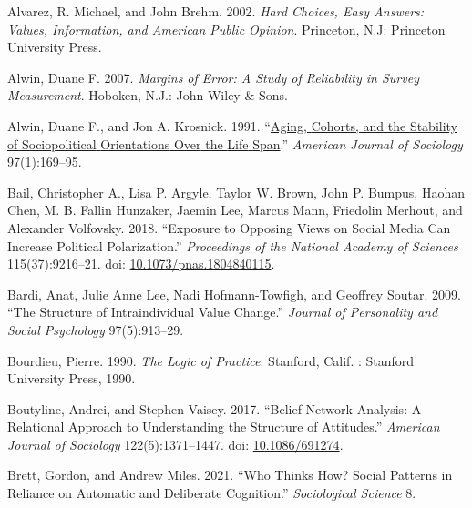 \documentclass[
  12pt,
]{article}
\newlength{\cslhangindent}
\newlength{\cslentryspacingunit} %
\newenvironment{CSLReferences}[2] %
 {%
  \setlength{\parindent}{0pt}
  \ifodd #1
  \let\oldpar\par
  \def\par{\hangindent=\cslhangindent\oldpar}
  \fi
  \setlength{\parskip}{#2\cslentryspacingunit}
 }%
 {}
\begin{document}
\hypertarget{refs}{}
\begin{CSLReferences}{1}{0}
\leavevmode{}%
Alvarez, R. Michael, and John Brehm. 2002. \emph{Hard Choices, Easy
Answers: Values, Information, and {American} Public Opinion}. Princeton,
N.J: Princeton University Press.

\leavevmode{}%
Alwin, Duane F. 2007. \emph{Margins of {Error}: {A} {Study} of
{Reliability} in {Survey} {Measurement}}. Hoboken, N.J.: John Wiley \&
Sons.

\leavevmode{}%
Alwin, Duane F., and Jon A. Krosnick. 1991.
{``\href{https://www.jstor.org/stable/2781642}{Aging, {Cohorts}, and the
{Stability} of {Sociopolitical} {Orientations} {Over} the {Life}
{Span}}.''} \emph{American Journal of Sociology} 97(1):169--95.

\leavevmode{}%
Bail, Christopher A., Lisa P. Argyle, Taylor W. Brown, John P. Bumpus,
Haohan Chen, M. B. Fallin Hunzaker, Jaemin Lee, Marcus Mann, Friedolin
Merhout, and Alexander Volfovsky. 2018. {``Exposure to Opposing Views on
Social Media Can Increase Political Polarization.''} \emph{Proceedings
of the National Academy of Sciences} 115(37):9216--21. doi:
\href{https://doi.org/10.1073/pnas.1804840115}{10.1073/pnas.1804840115}.

\leavevmode{}%
Bardi, Anat, Julie Anne Lee, Nadi Hofmann-Towfigh, and Geoffrey Soutar.
2009. {``The Structure of Intraindividual Value Change.''} \emph{Journal
of Personality and Social Psychology} 97(5):913--29.

\leavevmode{}%
Bourdieu, Pierre. 1990. \emph{The Logic of Practice}. Stanford, Calif. :
Stanford University Press, 1990.

\leavevmode{}%
Boutyline, Andrei, and Stephen Vaisey. 2017. {``Belief {Network}
{Analysis}: {A} {Relational} {Approach} to {Understanding} the
{Structure} of {Attitudes}.''} \emph{American Journal of Sociology}
122(5):1371--1447. doi:
\href{https://doi.org/10.1086/691274}{10.1086/691274}.

\leavevmode{}%
Brett, Gordon, and Andrew Miles. 2021. {``Who {Thinks} {How}? {Social}
{Patterns} in {Reliance} on {Automatic} and {Deliberate} {Cognition}.''}
\emph{Sociological Science} 8.


\end{CSLReferences}
\end{document}
